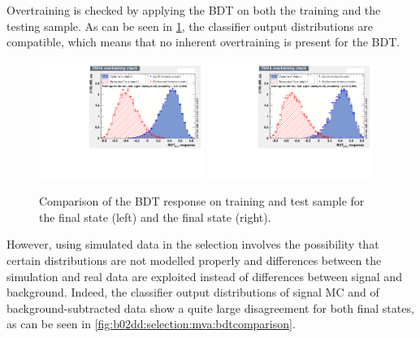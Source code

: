 Overtraining is checked by applying the BDT on both the training and the
testing sample. As can be seen in \cref{fig:b02dd:selection:mva:overtraining},
the classifier output distributions are compatible, which means that no
inherent overtraining is present for the BDT.
\begin{figure}[htb]
\centering
\includegraphics[width=0.48\textwidth]{07-B02DD/figs/Overtraining_Check_Kpipi.pdf}
\includegraphics[width=0.48\textwidth]{07-B02DD/figs/Overtraining_Check_KKpi.pdf}
\caption{Comparison of the BDT response on training and test sample for the
\KpipiKpipi final state (left) and the \KKpiKpipi final state (right).}
\label{fig:b02dd:selection:mva:overtraining}
\end{figure}
However, using simulated data in the selection involves the possibility that
certain distributions are not modelled properly and differences between the
simulation and real data are exploited instead of differences between signal
and background. Indeed, the classifier output distributions of signal MC and
of background-subtracted data show a quite large disagreement for both final
states, as can be seen in \cref{fig:b02dd:selection:mva:bdtcomparison}.
